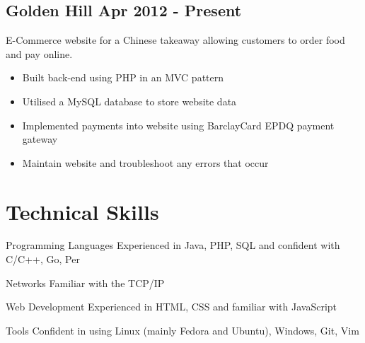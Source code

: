 \documentclass[a4paper]{article}
\begin{document}
\subsection*{Golden Hill \hfill Apr 2012 - Present}

E-Commerce website for a Chinese takeaway allowing customers to order food and pay online.

\begin{itemize}
    \item Built back-end using PHP in an MVC pattern
    \item Utilised a MySQL database to store website data
    \item Implemented payments into website using BarclayCard EPDQ payment gateway
    \item Maintain website and troubleshoot any errors that occur
\end{itemize}

\section*{Technical Skills}

\vspace{6pt}

\begin{eqlist}
    \item[Programming Languages] Experienced in Java, PHP, SQL and confident with C/C++, Go, Per
    \item[Networks] Familiar with the TCP/IP
    \item[Web Development] Experienced in HTML, CSS and familiar with JavaScript
    \item[Tools] Confident in using Linux (mainly Fedora and Ubuntu), Windows, Git, Vim
\end{eqlist}
\end{document}
